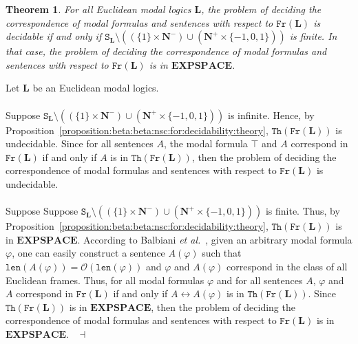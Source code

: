 \documentclass[draft]{article}
\newtheorem{theorem}{Theorem}
\newenvironment{proof}{{\bf Proof:}}{~$\dashv$\\}
\def\Th{\mathtt{Th}}
\def\Fr{\mathtt{Fr}}
\def\size{\mathtt{len}}
\def\EXPSPACE{\mathbf{EXPSPACE}}
\def\L{\mathbf{L}}
\begin{document}
%
%
%
%
%
%
%
%
%
%
%
%
%
%
%
%
%
%
%
%
%
%
%
%
%
%
%
%
\begin{theorem}\label{proposition:finale:correspondence:problem}
%
%
For all Euclidean modal logics $\L$, the problem of deciding the correspondence of modal formulas and sentences with respect to $\Fr(\L)$ is decidable if and only if $\mathtt{S}_{\L}{\setminus}((\{1\}{\times}\mathbf{N}^{-}){\cup}(\mathbf{N}^{+}{\times}\{{-}1,0,1\}))$ is finite.
In that case,
%
%
%
%
%
%
%
%
%
%
%
%
%
%
%
%
%
%
%
%
%
%
%
%
%
%
%
%
%
%
the problem of deciding the correspondence of modal formulas and sentences with respect to $\Fr(\L)$ is in $\EXPSPACE$.
%
%
\end{theorem}
%
%
\begin{proof}
%
%
Let $\L$ be an Euclidean modal logics.
%
%
\\
\\
%
%
Suppose $\mathtt{S}_{\L}{\setminus}((\{1\}{\times}\mathbf{N}^{-}){\cup}(\mathbf{N}^{+}{\times}\{{-}1,0,1\}))$ is infinite.
Hence, by Proposition~\ref{proposition:beta:beta:nsc:for:decidability:theory}, $\Th(\Fr(\L))$ is undecidable.
Since for all sentences $A$, the modal formula $\top$ and $A$ correspond in $\Fr(\L)$ if and only if $A$ is in $\Th(\Fr(\L))$, then the problem of deciding the correspondence of modal formulas and sentences with respect to $\Fr(\L)$ is undecidable.
%
%
\\
\\
%
%
Suppose Suppose $\mathtt{S}_{\L}{\setminus}((\{1\}{\times}\mathbf{N}^{-}){\cup}(\mathbf{N}^{+}{\times}\{{-}1,0,1\}))$ is finite.
Thus, by Proposition~\ref{proposition:beta:beta:nsc:for:decidability:theory}, $\Th(\Fr(\L))$ is in $\EXPSPACE$.
According to Balbiani {\it et al.}\/~\cite[Lem\-ma~$18$]{Balbiani:Georgiev:Tinchev:2018}, given an arbitrary modal formula $\varphi$, one can easily construct a sentence $A(\varphi)$ such that $\size(A(\varphi)){=}{\mathcal O}(\size(\varphi))$ and $\varphi$ and $A(\varphi)$ correspond in the class of all Euclidean frames.
Thus, for all modal formulas $\varphi$ and for all sentences $A$, $\varphi$ and $A$ correspond in $\Fr(\L)$ if and only if $A\leftrightarrow A(\varphi)$ is in $\Th(\Fr(\L))$.
Since $\Th(\Fr(\L))$ is in $\EXPSPACE$, then the problem of deciding the correspondence of modal formulas and sentences with respect to $\Fr(\L)$ is in $\EXPSPACE$.
%
%
\medskip
%
%
\end{proof}
\end{document}
